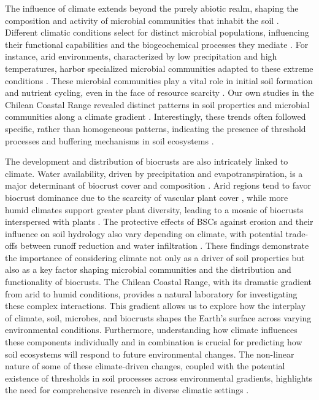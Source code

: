 The influence of climate extends beyond the purely abiotic realm, shaping the composition and activity of microbial communities that inhabit the soil \citep{Nemergut2005}. Different climatic conditions select for distinct microbial populations, influencing their functional capabilities and the biogeochemical processes they mediate \citep{Newsham2016}. For instance, arid environments, characterized by low precipitation and high temperatures, harbor specialized microbial communities adapted to these extreme conditions \citep{Pearce2012}. These microbial communities play a vital role in initial soil formation and nutrient cycling, even in the face of resource scarcity \citep{Bernhard2018}. Our own studies in the Chilean Coastal Range revealed distinct patterns in soil properties and microbial communities along a climate gradient \citep{Bernhard2018}. Interestingly, these trends often followed specific, rather than homogeneous patterns, indicating the presence of threshold processes and buffering mechanisms in soil ecosystems \citep{Bernhard2018}.

The development and distribution of biocrusts are also intricately linked to climate. Water availability, driven by precipitation and evapotranspiration, is a major determinant of biocrust cover and composition \citep{Bowker2016}. Arid regions tend to favor biocrust dominance due to the scarcity of vascular plant cover \citep{Colesie2016,Grote2010}, while more humid climates support greater plant diversity, leading to a mosaic of biocrusts interspersed with plants \citep{Issa1999}. The protective effects of BSCs against erosion and their influence on soil hydrology also vary depending on climate, with potential trade-offs between runoff reduction and water infiltration \citep{Kidron2022}. These findings demonstrate the importance of considering climate not only as a driver of soil properties but also as a key factor shaping microbial communities and the distribution and functionality of biocrusts. The Chilean Coastal Range, with its dramatic gradient from arid to humid conditions, provides a natural laboratory for investigating these complex interactions. This gradient allows us to explore how the interplay of climate, soil, microbes, and biocrusts shapes the Earth's surface across varying environmental conditions. Furthermore, understanding how climate influences these components individually and in combination is crucial for predicting how soil ecosystems will respond to future environmental changes. The non-linear nature of some of these climate-driven changes, coupled with the potential existence of thresholds in soil processes across environmental gradients, highlights the need for comprehensive research in diverse climatic settings \citep{Bernhard2018}.


